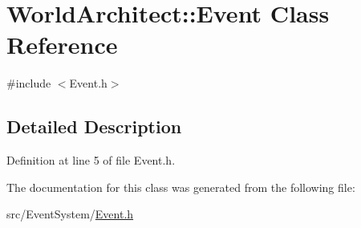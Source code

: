 \hypertarget{class_world_architect_1_1_event}{}\section{World\+Architect\+::Event Class Reference}
\label{class_world_architect_1_1_event}


{\ttfamily \#include $<$Event.\+h$>$}



\subsection{Detailed Description}


Definition at line 5 of file Event.\+h.



The documentation for this class was generated from the following file\+:\begin{DoxyCompactItemize}
\item 
src/\+Event\+System/\mbox{\hyperlink{_event_8h}{Event.\+h}}\end{DoxyCompactItemize}
